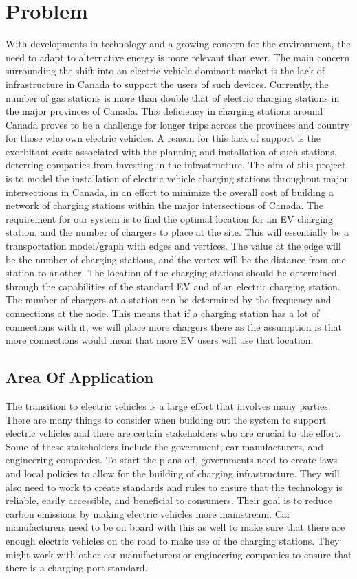 \documentclass[12pt, fleqn]{article}
\begin{document}
\break
\section{Problem}

With developments in technology and a growing concern for the environment, the need to adapt to alternative energy is more relevant than ever. The main concern surrounding the shift into an electric vehicle dominant market is the lack of infrastructure in Canada to support the users of such devices. Currently, the number of gas stations is more than double that of electric charging stations in the major provinces of Canada. This deficiency in charging stations around Canada proves to be a challenge for longer trips across the provinces and country for those who own electric vehicles. A reason for this lack of support is the exorbitant costs associated with the planning and installation of such stations, deterring companies from investing in the infrastructure. The aim of this project is to model the installation of electric vehicle charging stations throughout major intersections in Canada, in an effort to minimize the overall cost of building a network of charging stations within the major intersections of Canada. The requirement for our system is to find the optimal location for an EV charging station, and the number of chargers to place at the site. This will essentially be a transportation model/graph with edges and vertices. The value at the edge will be the number of charging stations, and the vertex will be the distance from one station to another. The location of the charging stations should be determined through the capabilities of the standard EV and of an electric charging station. The number of chargers at a station can be determined by the frequency and connections at the node. This means that if a charging station has a lot of connections with it, we will place more chargers there as the assumption is that more connections would mean that more EV users will use that location.


\subsection{Area Of Application}

The transition to electric vehicles is a large effort that involves many parties. There are many things to consider when building out the system to support electric vehicles and there are certain stakeholders who are crucial to the effort. Some of these stakeholders include the government, car manufacturers, and engineering companies. To start the plans off, governments need to create laws and local policies to allow for the building of charging infrastructure. They will also need to work to create standards and rules to ensure that the technology is reliable, easily accessible, and beneficial to consumers. Their goal is to reduce carbon emissions by making electric vehicles more mainstream. Car manufacturers need to be on board with this as well to make sure that there are enough electric vehicles on the road to make use of the charging stations. They might work with other car manufacturers or engineering companies to ensure that there is a charging port standard.
\end{document}
